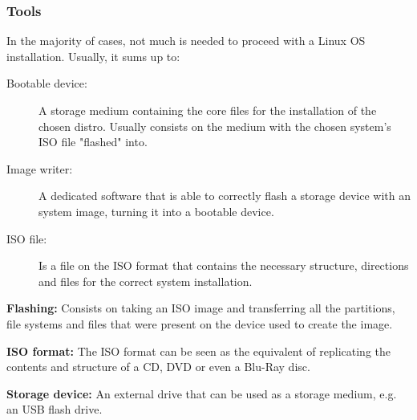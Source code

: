 \documentclass[a4paper,11pt]{article}
\begin{document}
\subsubsection{Tools}
In the majority of cases, not much is needed to proceed with a Linux OS
installation. Usually, it sums up to:
\begin{description}
    \item [Bootable device:] A storage medium containing the core files for the
        installation of the chosen distro. Usually consists on the medium with
        the chosen system's ISO file "flashed" into.
    \item [Image writer:] A dedicated software that is able to correctly flash
        a storage device with an system image, turning it into a bootable
        device.
    \item [ISO file:] Is a file on the ISO format that contains the necessary
        structure, directions and files for the correct system installation.
\end{description}
\begin{definitionbox}
    \textbf{Flashing:} Consists on taking an ISO image and transferring all the
    partitions, file systems and files that were present on the device used to
    create the image.\par 
    \textbf{ISO format:} The ISO format can be seen as the equivalent of replicating
        the contents and structure of a CD, DVD or even a Blu-Ray disc.\par 
        \textbf{Storage device:} An external drive that can be used as a storage
        medium, e.g. an USB flash drive.  
\end{definitionbox}
\end{document}
